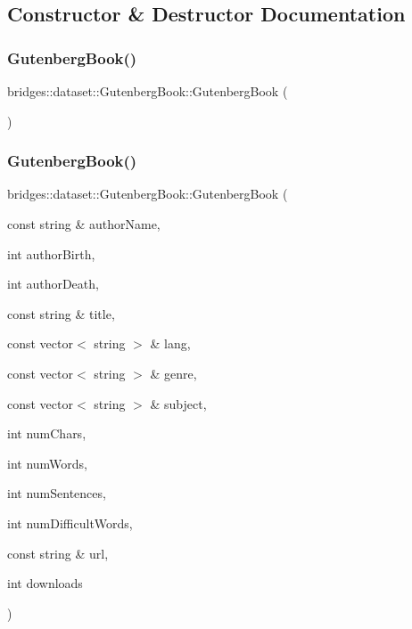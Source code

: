 \subsection{Constructor \& Destructor Documentation}
\mbox{\label{classbridges_1_1dataset_1_1_gutenberg_book_ab88639acb3d28345f1db063d603f1123}} 
\subsubsection{\texorpdfstring{GutenbergBook()}{GutenbergBook()}\hspace{0.1cm}{\footnotesize\ttfamily [1/2]}}
{\footnotesize\ttfamily bridges\+::dataset\+::\+Gutenberg\+Book\+::\+Gutenberg\+Book (\begin{DoxyParamCaption}{ }\end{DoxyParamCaption})\hspace{0.3cm}{\ttfamily [inline]}}

\mbox{\label{classbridges_1_1dataset_1_1_gutenberg_book_abe1720623c08625c3e8760830d6c1aa0}} 
\subsubsection{\texorpdfstring{GutenbergBook()}{GutenbergBook()}\hspace{0.1cm}{\footnotesize\ttfamily [2/2]}}
{\footnotesize\ttfamily bridges\+::dataset\+::\+Gutenberg\+Book\+::\+Gutenberg\+Book (\begin{DoxyParamCaption}\item[{const string \&}]{author\+Name,  }\item[{int}]{author\+Birth,  }\item[{int}]{author\+Death,  }\item[{const string \&}]{title,  }\item[{const vector$<$ string $>$ \&}]{lang,  }\item[{const vector$<$ string $>$ \&}]{genre,  }\item[{const vector$<$ string $>$ \&}]{subject,  }\item[{int}]{num\+Chars,  }\item[{int}]{num\+Words,  }\item[{int}]{num\+Sentences,  }\item[{int}]{num\+Difficult\+Words,  }\item[{const string \&}]{url,  }\item[{int}]{downloads }\end{DoxyParamCaption})\hspace{0.3cm}{\ttfamily [inline]}}



